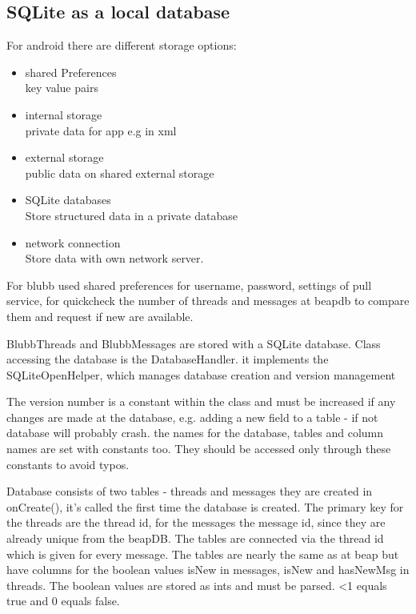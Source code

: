 \documentclass[12pt,a4paper,oneside]{report}
\begin{document}
\subsection{SQLite as a local database}

For android there are different storage options\citep{aDefStorageOpt}:
\begin{itemize}
\item{shared Preferences \\key value pairs}
\item{internal storage \\private data for app e.g in xml}
\item{external storage \\public data on shared external storage}
\item{SQLite databases \\Store structured data in a private database}
\item{network connection \\Store data with own network server.}
\end{itemize}
 

For blubb used shared preferences for username, password, settings of pull service, for quickcheck the number of threads and messages at beapdb to compare them and request if new are available.

BlubbThreads and BlubbMessages are stored with a SQLite database. 
Class accessing the database is the DatabaseHandler.
it implements the SQLiteOpenHelper, which manages database creation and version management \citep{aDefSQLiteOpenHelper}

The version number is a constant within the class and must be increased if any changes are made at the database, e.g. adding a new field to a table - if not database will probably crash.
the names for the database, tables and column names are set with constants too. They should be accessed only through these constants to avoid typos. 

Database consists of two tables - threads and messages
they are created in onCreate(), it's called the first time the database is created. The primary key for the threads are the thread id, for the messages the message id, since they are already unique from the beapDB. The tables are connected via the thread id which is given for every message.
The tables are nearly the same as at beap but have columns for the boolean values isNew in messages, isNew and hasNewMsg in threads. The boolean values are stored as ints and must be parsed. <1 equals true and 0 equals false. 
\end{document}
